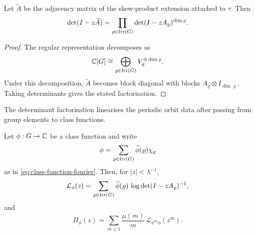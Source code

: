 \begin{proposition}
  \label{prop:kernel-peter-weyl-block-diagonalisation}
  Let \(\widetilde A\) be the adjacency matrix of the skew-product
  extension attached to \(\tau\). Then
  \[
    \det(I-z\widetilde A)
    =
    \prod_{\varrho\in\operatorname{Irr}(G)}
      \det(I-zA_\varrho)^{\dim\varrho}.
  \]
\end{proposition}

\begin{proof}
  The regular representation decomposes as
  \[
    \mathbb{C}[G]
    \cong
    \bigoplus_{\varrho\in\operatorname{Irr}(G)}
      V_\varrho^{\oplus \dim\varrho}.
  \]
  Under this decomposition, \(\widetilde A\) becomes block diagonal with
  blocks \(A_\varrho\otimes I_{\dim\varrho}\). Taking determinants gives
  the stated factorisation.
\end{proof}

\noindent
The determinant factorisation linearises the periodic orbit data after
passing from group elements to class functions.

\begin{theorem}
  \label{thm:class-function-adams-mobius}
  Let \(\phi:G\to\mathbb{C}\) be a class function and write
  \[
    \phi=\sum_{\varrho\in\operatorname{Irr}(G)}\widehat\phi(\varrho)\chi_\varrho
  \]
  as in \eqref{eq:class-function-fourier}. Then, for \(|z|<\lambda^{-1}\),
  \begin{equation}\label{eq:class-logarithm-determinant-linearisation}
    \mathcal L_\phi(z)
    =
    \sum_{\varrho\in\operatorname{Irr}(G)}
      \widehat\phi(\varrho)\,
      \log\det(I-zA_\varrho)^{-1},
  \end{equation}
  and
  \begin{equation}\label{eq:class-adams-mobius-inversion}
    \Pi_\phi(z)
    =
    \sum_{m\ge 1}\frac{\mu(m)}{m}\,
      \mathcal L_{\psi^m\phi}(z^m).
  \end{equation}
\end{theorem}

